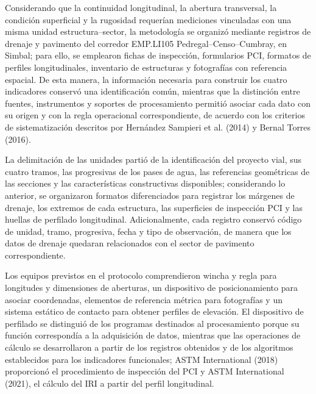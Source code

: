 \begingroup
\setlength{\emergencystretch}{2em}


Considerando que la continuidad longitudinal, la abertura transversal, la condición superficial y la rugosidad requerían mediciones vinculadas con una misma unidad estructura–sector, la metodología se organizó mediante registros de drenaje y pavimento del corredor EMP.LI105 Pedregal–Censo–Cumbray, en Simbal; para ello, se emplearon fichas de inspección, formularios PCI, formatos de perfiles longitudinales, inventario de estructuras y fotografías con referencia espacial. De esta manera, la información necesaria para construir los cuatro indicadores conservó una identificación común, mientras que la distinción entre fuentes, instrumentos y soportes de procesamiento permitió asociar cada dato con su origen y con la regla operacional correspondiente, de acuerdo con los criterios de sistematización descritos por Hernández Sampieri et al. (2014) y Bernal Torres (2016).

La delimitación de las unidades partió de la identificación del proyecto vial, sus cuatro tramos, las progresivas de los pases de agua, las referencias geométricas de las secciones y las características constructivas disponibles; considerando lo anterior, se organizaron formatos diferenciados para registrar los márgenes de drenaje, los extremos de cada estructura, las superficies de inspección PCI y las huellas de perfilado longitudinal. Adicionalmente, cada registro conservó código de unidad, tramo, progresiva, fecha y tipo de observación, de manera que los datos de drenaje quedaran relacionados con el sector de pavimento correspondiente.

Los equipos previstos en el protocolo comprendieron wincha y regla para longitudes y dimensiones de aberturas, un dispositivo de posicionamiento para asociar coordenadas, elementos de referencia métrica para fotografías y un sistema estático de contacto para obtener perfiles de elevación. El dispositivo de perfilado se distinguió de los programas destinados al procesamiento porque su función correspondía a la adquisición de datos, mientras que las operaciones de cálculo se desarrollaron a partir de los registros obtenidos y de los algoritmos establecidos para los indicadores funcionales; ASTM International (2018) proporcionó el procedimiento de inspección del PCI y ASTM International (2021), el cálculo del IRI a partir del perfil longitudinal.

